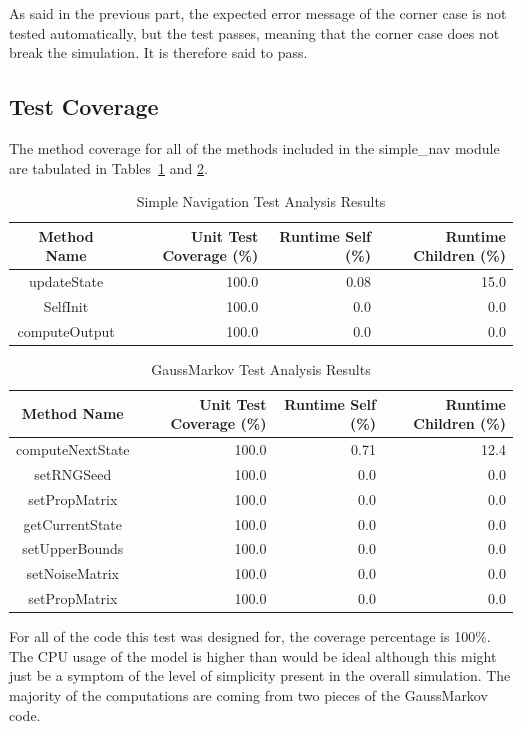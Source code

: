 As said in the previous part, the expected error message of the corner case is not tested automatically,
but the test passes, meaning that the corner case does not break the simulation. It is therefore said to
pass.



\subsection{Test Coverage}
The method coverage for all of the methods included in the simple\_nav
module are tabulated in Tables~\ref{tab:cov_met} and \ref{tab:cov_met2}.

\begin{table}[htbp]
	\caption{Simple Navigation Test Analysis Results}
	\label{tab:cov_met}
	\centering \fontsize{10}{10}\selectfont
	\begin{tabular}{c | r | r | r} %
		\hline
		Method Name    & Unit Test Coverage (\%) & Runtime Self (\%) & Runtime Children (\%) \\
		\hline
		updateState & 100.0 & 0.08 & 15.0 \\
		SelfInit & 100.0 & 0.0 & 0.0 \\
		computeOutput & 100.0 & 0.0 & 0.0 \\
		\hline
	\end{tabular}
\end{table}

\begin{table}[htbp]
	\caption{GaussMarkov Test Analysis Results}
	\label{tab:cov_met2}
	\centering \fontsize{10}{10}\selectfont
	\begin{tabular}{c | r | r | r} %
		\hline
		Method Name    & Unit Test Coverage (\%) & Runtime Self (\%) & Runtime Children (\%) \\
		\hline
		computeNextState & 100.0 & 0.71 & 12.4 \\
		setRNGSeed & 100.0 & 0.0 & 0.0 \\
		setPropMatrix & 100.0 & 0.0 & 0.0 \\
		getCurrentState & 100.0 & 0.0 & 0.0 \\
		setUpperBounds & 100.0 & 0.0 & 0.0 \\
		setNoiseMatrix & 100.0 & 0.0 & 0.0 \\
		setPropMatrix & 100.0 & 0.0 & 0.0 \\
		\hline
	\end{tabular}
\end{table}
For all of the code this test was designed for, the coverage percentage is
100\%.  The CPU usage of the model is higher than would be ideal although this
might just be a symptom of the level of simplicity present in the overall
simulation.  The majority of the computations are coming from two pieces of the
GaussMarkov code.


